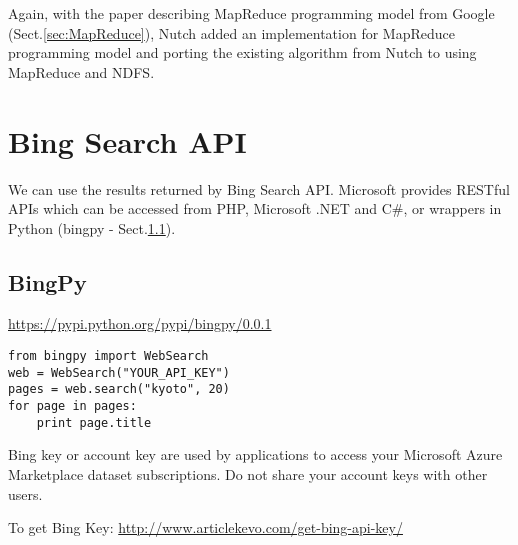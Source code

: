 Again, with the paper describing MapReduce programming model from Google
(Sect.\ref{sec:MapReduce}), Nutch added an implementation for MapReduce
programming model and porting the existing algorithm from Nutch to using
MapReduce and NDFS.


\section{Bing Search API}

We can use the results returned by Bing Search API.
Microsoft provides RESTful APIs which can be accessed from PHP, Microsoft .NET
and C\#, or wrappers in Python (bingpy - Sect.\ref{sec:bingpy}).


\subsection{BingPy}
\label{sec:bingpy}

\url{https://pypi.python.org/pypi/bingpy/0.0.1}

\begin{verbatim}
from bingpy import WebSearch
web = WebSearch("YOUR_API_KEY")
pages = web.search("kyoto", 20)
for page in pages:
    print page.title
\end{verbatim}

Bing key or account key are used by applications to access your Microsoft Azure
Marketplace dataset subscriptions. Do not share your account keys with other users.

To get Bing Key: \url{http://www.articlekevo.com/get-bing-api-key/}
%     
